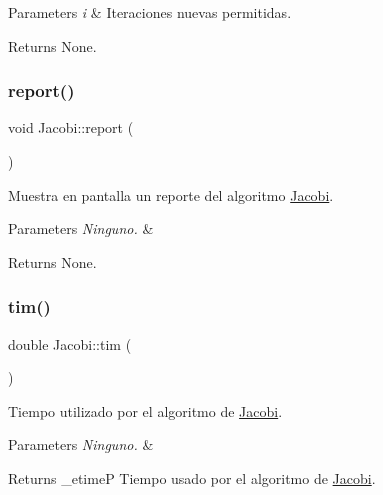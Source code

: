 \begin{DoxyParams}{Parameters}
{\em i} & Iteraciones nuevas permitidas. \\
\hline
\end{DoxyParams}
\begin{DoxyReturn}{Returns}
None. 
\end{DoxyReturn}
\hypertarget{class_jacobi_abe57a404f09716e07721c74c715a3b42}{}\label{class_jacobi_abe57a404f09716e07721c74c715a3b42} 
\subsubsection{\texorpdfstring{report()}{report()}}
{\footnotesize\ttfamily void Jacobi\+::report (\begin{DoxyParamCaption}{ }\end{DoxyParamCaption})\hspace{0.3cm}{\ttfamily [inline]}}



Muestra en pantalla un reporte del algoritmo \hyperlink{class_jacobi}{Jacobi}. 


\begin{DoxyParams}{Parameters}
{\em Ninguno.} & \\
\hline
\end{DoxyParams}
\begin{DoxyReturn}{Returns}
None. 
\end{DoxyReturn}
\hypertarget{class_jacobi_a949ec5de87b55889cb3e69400e1e50b7}{}\label{class_jacobi_a949ec5de87b55889cb3e69400e1e50b7} 
\subsubsection{\texorpdfstring{tim()}{tim()}}
{\footnotesize\ttfamily double Jacobi\+::tim (\begin{DoxyParamCaption}{ }\end{DoxyParamCaption})\hspace{0.3cm}{\ttfamily [inline]}}



Tiempo utilizado por el algoritmo de \hyperlink{class_jacobi}{Jacobi}. 


\begin{DoxyParams}{Parameters}
{\em Ninguno.} & \\
\hline
\end{DoxyParams}
\begin{DoxyReturn}{Returns}
\+\_\+etimeP Tiempo usado por el algoritmo de \hyperlink{class_jacobi}{Jacobi}. 
\end{DoxyReturn}
\hypertarget{class_jacobi_a43d8a58638f07dc6c427251efe5d6af8}{}\label{class_jacobi_a43d8a58638f07dc6c427251efe5d6af8} 
